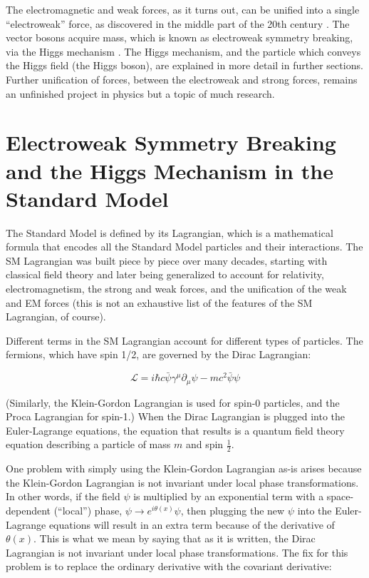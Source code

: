 The electromagnetic and weak forces, as it turns out, can be unified into a single ``electroweak'' force, as discovered in the middle part of the 20th century \cite{Weinberg}.  The vector bosons acquire mass, which is known as electroweak symmetry breaking, via the Higgs mechanism \cite{Higgs-1} \cite{Englert_Brout} \cite{Guralnik_Hagen_Kibble}.  The Higgs mechanism, and the particle which conveys the Higgs field (the Higgs boson), are explained in more detail in further sections.  Further unification of forces, between the electroweak and strong forces, remains an unfinished project in physics but a topic of much research.  

\section{Electroweak Symmetry Breaking and the Higgs Mechanism in the Standard Model}
The Standard Model is defined by its Lagrangian, which is a mathematical formula that encodes all the Standard Model particles and their interactions.  The SM Lagrangian was built piece by piece over many decades, starting with classical field theory and later being generalized to account for relativity, electromagnetism, the strong and weak forces, and the unification of the weak and EM forces (this is not an exhaustive list of the features of the SM Lagrangian, of course).  

Different terms in the SM Lagrangian account for different types of particles.  The fermions, which have spin 1/2, are governed by the Dirac Lagrangian:

\begin{equation}
\mathscr{L}= i\hbar c \bar{\psi} \gamma^\mu \partial_\mu \psi -mc^2 \bar{\psi}\psi
\end{equation}

(Similarly, the Klein-Gordon Lagrangian is used for spin-0 particles, and the Proca Lagrangian for spin-1.)  When the Dirac Lagrangian is plugged into the Euler-Lagrange equations, the equation that results is a quantum field theory equation describing a particle of mass $m$ and spin $\frac{1}{2}$.  

One problem with simply using the Klein-Gordon Lagrangian as-is arises because the Klein-Gordon Lagrangian is not invariant under local phase transformations.  In other words, if the field $\psi$ is multiplied by an exponential term with a space-dependent (``local'') phase, $\psi \rightarrow e^{i\theta(x)} \psi$, then plugging the new $\psi$ into the Euler-Lagrange equations will result in an extra term because of the derivative of $\theta(x)$.  This is what we mean by saying that as it is written, the Dirac Lagrangian is not invariant under local phase transformations.  The fix for this problem is to replace the ordinary derivative with the covariant derivative:

